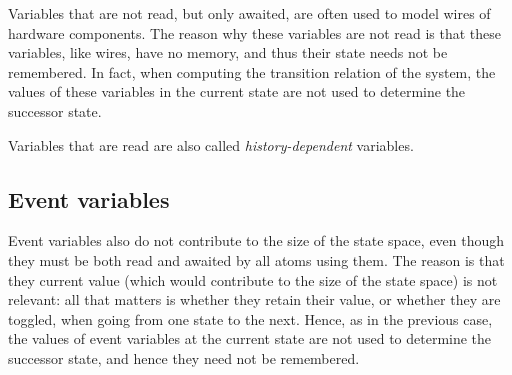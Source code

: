 {Variables that are not read, but only awaited, are often used to model
wires of hardware components.  The reason why these variables are not
read is that these variables, like wires, have no memory, and thus
their state needs not be remembered.  In fact, when computing the
transition relation of the system, the
values of these variables in the current state are not used to
determine the successor state. 

Variables that are read are also called {\em
history-dependent} variables.


\subsection{Event variables}

Event variables also do not contribute to the size of the state space,
even though they must be both read and awaited by all atoms using
them.  The reason is that they current value (which would contribute
to the size of the state space) is not relevant: all that matters is
whether they retain their value, or whether they are toggled, when
going from one state to the next.  Hence, as in the previous case, the
values of event variables at the current state are not used to
determine the successor state, and hence they need not be remembered.



\begin{comment}
module Memory
  atom 
    controls m, out
    reads m, write1, write2, read1, read2, in1, in2 
    awaits write1, write2, read1, read2
  update
    [] write1? -> m'   := in1
    [] write2? -> m'   := in2
    [] read1?  -> out' := m 
    [] read2?  -> out' := m 
  endatom     

-- Arbiter for who has the permission to change xl

  lazy atom

    controls grant1, grant2, released1, released2, last, busy

    reads    grant1, grant2, released1, released2, last, busy,
             rel1, rel2, req1, req2

  init
    [] true                              -> busy' := 0; last' := 1
  update
    [] req1 & ~req2 & busy = 0           -> grant1!; busy' := 1; last' := 1
    [] req2 & ~req1 & busy = 0           -> grant2!; busy' := 2; last' := 2
    [] req1 & req2 & busy = 0 & last = 1 -> grant2!; busy' := 2; last' := 2
    [] req1 & req2 & busy = 0 & last = 2 -> grant1!; busy' := 1; last' := 1
    [] rel1 & busy = 1                   -> busy' := 0; released1!
    [] rel2 & busy = 2                   -> busy' := 0; released2!
  endatom


\end{comment}}
